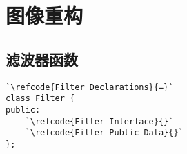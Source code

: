 \section{图像重构}\label{sec:图像重构}

\subsection{滤波器函数}\label{sub:滤波器函数}
\label{code:overview_Filter}
\begin{lstlisting}
`\refcode{Filter Declarations}{=}`
class Filter {
public:
    `\refcode{Filter Interface}{}`
    `\refcode{Filter Public Data}{}`
};
\end{lstlisting}